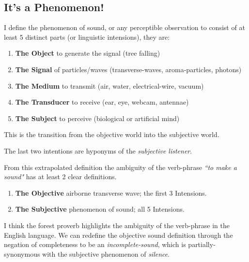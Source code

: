 \newpage
\subsection{It's a Phenomenon!}
I define the phenomenon of sound, or any perceptible observation to consist of at least 5 distinct parts (or linguistic intensions), they are:

\begin{enumerate}
    \item \textbf{The Object} to generate the signal (tree falling)

    \item \textbf{The Signal} of particles/waves (transverse-waves, aroma-particles, photons)

    \item \textbf{The Medium} to transmit  (air, water, electrical-wire, vacuum)

    \item \textbf{The Transducer} to receive (ear, eye, webcam, antennae)

    \item \textbf{The Subject} to perceive (biological or artificial mind)
\end{enumerate}

This is the transition from the objective world into the subjective world.

The last two intentions are hyponyms of the \textit{subjective listener}.

From this extrapolated definition the ambiguity of the verb-phrase \textit{``to make a sound"} has at least 2 clear definitions.

\begin{enumerate}
    \item \textbf{The Objective} airborne transverse wave; the first 3 Intensions.

    \item \textbf{The Subjective} phenomenon of sound; all 5 Intensions.
\end{enumerate}

I think the forest proverb highlights the ambiguity of the verb-phrase in the English language. We can redefine the objective sound definition through the negation of completeness to be an \textit{incomplete-sound}, which is partially-synonymous with the subjective phenomenon of \textit{silence}.


